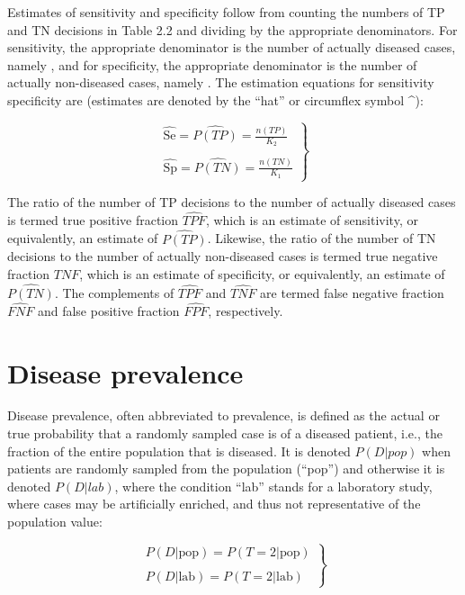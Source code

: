 \documentclass[
]{book}
\begin{document}
Estimates of sensitivity and specificity follow from counting the numbers of TP and TN decisions in Table 2.2 and dividing by the appropriate denominators. For sensitivity, the appropriate denominator is the number of actually diseased cases, namely , and for specificity, the appropriate denominator is the number of actually non-diseased cases, namely . The estimation equations for sensitivity specificity are (estimates are denoted by the ``hat'' or circumflex symbol \^{}):

\begin{equation} 
\left.\begin{matrix}
\widehat{\text{Se}}=\widehat{P(TP)}=\frac{n(TP)}{K_2}\\
\\ 
\widehat{\text{Sp}}=\widehat{P(TN)}=\frac{n(TN)}{K_1}
\end{matrix}\right\}
\label{eq:binaryTask0SeSpEstimates}
\end{equation}

The ratio of the number of TP decisions to the number of actually diseased cases is termed true positive fraction \(\widehat{TPF}\), which is an estimate of sensitivity, or equivalently, an estimate of \(\widehat{P(TP)}\). Likewise, the ratio of the number of TN decisions to the number of actually non-diseased cases is termed true negative fraction \(\widehat{TNF}\), which is an estimate of specificity, or equivalently, an estimate of \(\widehat{P(TN)}\). The complements of \(\widehat{TPF}\) and \(\widehat{TNF}\) are termed false negative fraction \(\widehat{FNF}\) and false positive fraction \(\widehat{FPF}\), respectively.

\hypertarget{disease-prevalence}{%
\section{Disease prevalence}\label{disease-prevalence}}

Disease prevalence, often abbreviated to prevalence, is defined as the actual or true probability that a randomly sampled case is of a diseased patient, i.e., the fraction of the entire population that is diseased. It is denoted \(P(D|pop)\) when patients are randomly sampled from the population (``pop'') and otherwise it is denoted \(P(D|lab)\), where the condition ``lab'' stands for a laboratory study, where cases may be artificially enriched, and thus not representative of the population value:

\begin{equation} 
\left.\begin{matrix}
P(D|\text{pop})=P(T=2|\text{pop})\\
\\ 
P(D|\text{lab})=P(T=2|\text{lab})
\end{matrix}\right\}
\label{eq:binaryTask0DisPrev}
\end{equation}
\end{document}
